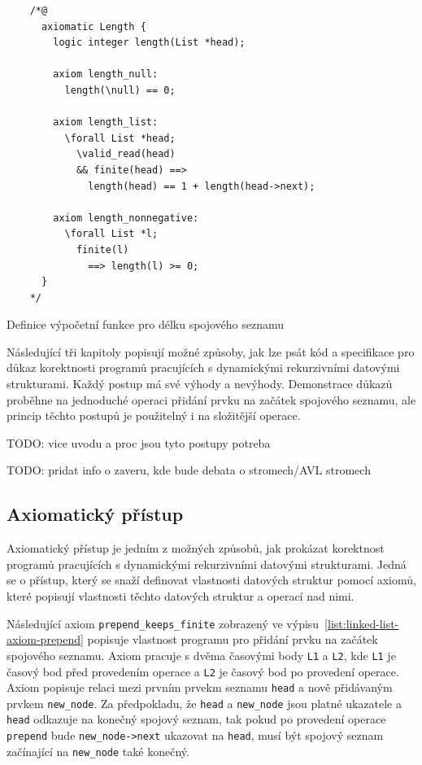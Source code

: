 \begin{listing}[H]
    \begin{verbatim}
    /*@
      axiomatic Length {
        logic integer length(List *head);

        axiom length_null:
          length(\null) == 0;

        axiom length_list:
          \forall List *head;
            \valid_read(head)
            && finite(head) ==>
              length(head) == 1 + length(head->next);

        axiom length_nonnegative:
          \forall List *l;
            finite(l)
              ==> length(l) >= 0;
      }
    */
    \end{verbatim}
    \caption{Definice výpočetní funkce pro délku spojového seznamu}
    \label{list:linked-list-length}
\end{listing}

Následující tři kapitoly popisují možné způsoby,
jak lze psát kód a specifikace pro důkaz korektnosti programů pracujících
s dynamickými rekurzivními datovými strukturami.
Každý postup má své výhody a nevýhody.
Demonstrace důkazů proběhne na jednoduché operaci přidání prvku na začátek spojového seznamu,
ale princip těchto postupů je použitelný i na složitější operace.

TODO: vice uvodu a proc jsou tyto postupy potreba

TODO: pridat info o zaveru, kde bude debata o stromech/AVL stromech

\subsection{Axiomatický přístup}
\label{subsec:axiomaticky-pristup}

Axiomatický přístup je jedním z možných způsobů,
jak prokázat korektnost programů pracujících s dynamickými rekurzivními datovými strukturami.
Jedná se o přístup,
který se snaží definovat vlastnosti datových struktur pomocí axiomů,
které popisují vlastnosti těchto datových struktur a operací nad nimi.

Následující axiom \texttt{prepend\_keeps\_finite} zobrazený ve výpisu~\ref{list:linked-list-axiom-prepend}
popisuje vlastnost programu pro přidání prvku na začátek spojového seznamu.
Axiom pracuje s dvěma časovými body \texttt{L1} a \texttt{L2},
kde \texttt{L1} je časový bod před provedením operace
a \texttt{L2} je časový bod po provedení operace.
Axiom popisuje relaci mezi prvním prvekm seznamu \texttt{head} a nově přidávaným prvkem \texttt{new\_node}.
Za předpokladu, že \texttt{head} a \texttt{new\_node} jsou platné ukazatele
a \texttt{head} odkazuje na konečný spojový seznam,
tak pokud po provedení operace \texttt{prepend} bude \texttt{new\_node->next} ukazovat na \texttt{head},
musí být spojový seznam začínající na \texttt{new\_node} také konečný.

